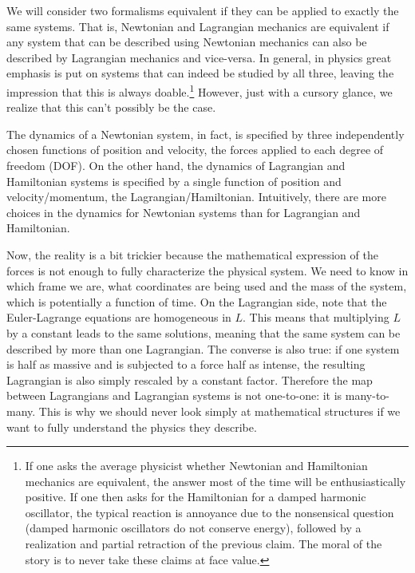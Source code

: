 We will consider two formalisms equivalent if they can be applied to exactly the same systems. That is, Newtonian and Lagrangian mechanics are equivalent if any system that can be described using Newtonian mechanics can also be described by Lagrangian mechanics and vice-versa. In general, in physics great emphasis is put on systems that can indeed be studied by all three, leaving the impression that this is always doable.\footnote{If one asks the average physicist whether Newtonian and Hamiltonian mechanics are equivalent, the answer most of the time will be  enthusiastically positive. If one then asks for the Hamiltonian for a damped harmonic oscillator, the typical reaction is annoyance due to the nonsensical question (damped harmonic oscillators do not conserve energy), followed by a realization and partial retraction of the previous claim. The moral of the story is to never take these claims at face value.} However, just with a cursory glance, we realize that this can't possibly be the case.

The dynamics of a Newtonian system, in fact, is specified by three independently chosen functions of position and velocity, the forces applied to each degree of freedom (DOF). On the other hand, the dynamics of Lagrangian and Hamiltonian systems is specified by a single function of position and velocity/momentum, the Lagrangian/Hamiltonian. Intuitively, there are more choices in the dynamics for Newtonian systems than for Lagrangian and Hamiltonian.

Now, the reality is a bit trickier because the mathematical expression of the forces is not enough to fully characterize the physical system. We need to know in which frame we are, what coordinates are being used and the mass of the system, which is potentially a function of time. On the Lagrangian side, note that the Euler-Lagrange equations are homogeneous in $L$. This means that multiplying $L$ by a constant leads to the same solutions, meaning that the same system can be described by more than one Lagrangian. The converse is also true: if one system is half as massive and is subjected to a force half as intense, the resulting Lagrangian is also simply rescaled by a constant factor. Therefore the map between Lagrangians and Lagrangian systems is not one-to-one: it is many-to-many. This is why we should never look simply at mathematical structures if we want to fully understand the physics they describe.

